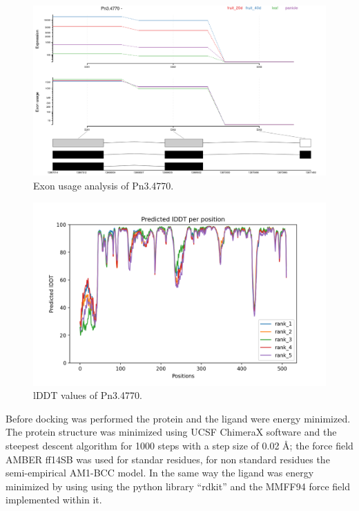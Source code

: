 \documentclass[12pt]{article}
\begin{document}
	\FloatBarrier
	\begin{figure}[h!]
		\centering
		\includegraphics[width=\textwidth-50pt]{../5/known/Transcripts/7.png}
		\caption{\centering Exon usage analysis of Pn3.4770.}
		\label{fig5k_1}
	\end{figure}
	\FloatBarrier
	
	\FloatBarrier
	\begin{figure}[h!]
		\centering
		\includegraphics[width=\textwidth-50pt]{../5/known/AlphaFold2/Met_dioixi_ef326_plddt.png}
		\caption{\centering lDDT values of Pn3.4770.}
		\label{fig5k_3}
	\end{figure}
	\FloatBarrier
	
	\newpage
	
	Before docking was performed the protein and the ligand were energy minimized. The protein structure was minimized using UCSF ChimeraX software \cite{chimera,chimera_2} and the steepest descent algorithm for 1000 steps with a step size of 0.02 \r{A}; the force field AMBER ff14SB was used for standar residues, for non standard residues the semi-empirical AM1-BCC model. \cite{am1_bcc,am1_bcc_2,am1_bcc_3} In the same way the ligand was energy minimized by using using the python library ``rdkit'' and the MMFF94 force field implemented within it. \cite{rdkit,rdkit_mmff}
	
\end{document}

